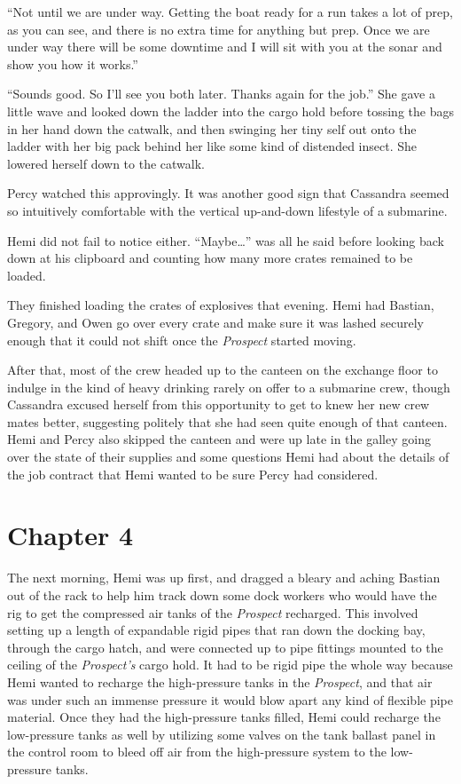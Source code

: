 \documentclass[
]{scrbook}
\begin{document}
``Not until we are under way. Getting the boat ready for a run takes a
lot of prep, as you can see, and there is no extra time for anything but
prep. Once we are under way there will be some downtime and I will sit
with you at the sonar and show you how it works.''

``Sounds good. So I'll see you both later. Thanks again for the job.''
She gave a little wave and looked down the ladder into the cargo hold
before tossing the bags in her hand down the catwalk, and then swinging
her tiny self out onto the ladder with her big pack behind her like some
kind of distended insect. She lowered herself down to the catwalk.

Percy watched this approvingly. It was another good sign that Cassandra
seemed so intuitively comfortable with the vertical up-and-down
lifestyle of a submarine.

Hemi did not fail to notice either. ``Maybe\ldots{}'' was all he said
before looking back down at his clipboard and counting how many more
crates remained to be loaded.

They finished loading the crates of explosives that evening. Hemi had
Bastian, Gregory, and Owen go over every crate and make sure it was
lashed securely enough that it could not shift once the \emph{Prospect}
started moving.

After that, most of the crew headed up to the canteen on the exchange
floor to indulge in the kind of heavy drinking rarely on offer to a
submarine crew, though Cassandra excused herself from this opportunity
to get to knew her new crew mates better, suggesting politely that she
had seen quite enough of that canteen. Hemi and Percy also skipped the
canteen and were up late in the galley going over the state of their
supplies and some questions Hemi had about the details of the job
contract that Hemi wanted to be sure Percy had considered.

\hypertarget{chapter-4}{%
\chapter*{Chapter 4}\label{chapter-4}}

The next morning, Hemi was up first, and dragged a bleary and aching
Bastian out of the rack to help him track down some dock workers who
would have the rig to get the compressed air tanks of the
\emph{Prospect} recharged. This involved setting up a length of
expandable rigid pipes that ran down the docking bay, through the cargo
hatch, and were connected up to pipe fittings mounted to the ceiling of
the \emph{Prospect's} cargo hold. It had to be rigid pipe the whole way
because Hemi wanted to recharge the high-pressure tanks in the
\emph{Prospect}, and that air was under such an immense pressure it
would blow apart any kind of flexible pipe material. Once they had the
high-pressure tanks filled, Hemi could recharge the low-pressure tanks
as well by utilizing some valves on the tank ballast panel in the
control room to bleed off air from the high-pressure system to the
low-pressure tanks.
\end{document}
